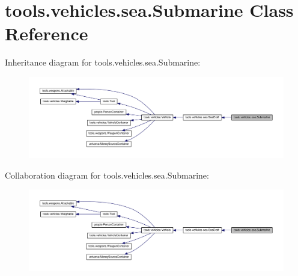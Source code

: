 \hypertarget{classtools_1_1vehicles_1_1sea_1_1_submarine}{}\section{tools.\+vehicles.\+sea.\+Submarine Class Reference}
\label{classtools_1_1vehicles_1_1sea_1_1_submarine}


Inheritance diagram for tools.\+vehicles.\+sea.\+Submarine\+:
\nopagebreak
\begin{figure}[H]
\begin{center}
\leavevmode
\includegraphics[width=350pt]{classtools_1_1vehicles_1_1sea_1_1_submarine__inherit__graph}
\end{center}
\end{figure}


Collaboration diagram for tools.\+vehicles.\+sea.\+Submarine\+:
\nopagebreak
\begin{figure}[H]
\begin{center}
\leavevmode
\includegraphics[width=350pt]{classtools_1_1vehicles_1_1sea_1_1_submarine__coll__graph}
\end{center}
\end{figure}
